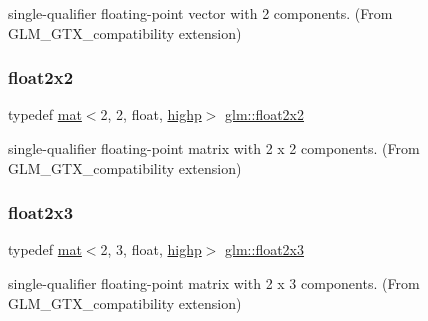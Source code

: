 single-\/qualifier floating-\/point vector with 2 components. (From G\+L\+M\+\_\+\+G\+T\+X\+\_\+compatibility extension) 

\mbox{\label{group__gtx__compatibility_gab3fb1cd56ec3f5407a4d3b9173bd88ae}} 
\subsubsection{\texorpdfstring{float2x2}{float2x2}}
{\footnotesize\ttfamily typedef \hyperlink{structglm_1_1mat}{mat}$<$2, 2, float, \hyperlink{namespaceglm_a36ed105b07c7746804d7fdc7cc90ff25ac6f7eab42eacbb10d59a58e95e362074}{highp}$>$ \hyperlink{group__gtx__compatibility_gab3fb1cd56ec3f5407a4d3b9173bd88ae}{glm\+::float2x2}}



single-\/qualifier floating-\/point matrix with 2 x 2 components. (From G\+L\+M\+\_\+\+G\+T\+X\+\_\+compatibility extension) 

\mbox{\label{group__gtx__compatibility_ga32644dc8b8177c22355e4d03b06061ac}} 
\subsubsection{\texorpdfstring{float2x3}{float2x3}}
{\footnotesize\ttfamily typedef \hyperlink{structglm_1_1mat}{mat}$<$2, 3, float, \hyperlink{namespaceglm_a36ed105b07c7746804d7fdc7cc90ff25ac6f7eab42eacbb10d59a58e95e362074}{highp}$>$ \hyperlink{group__gtx__compatibility_ga32644dc8b8177c22355e4d03b06061ac}{glm\+::float2x3}}



single-\/qualifier floating-\/point matrix with 2 x 3 components. (From G\+L\+M\+\_\+\+G\+T\+X\+\_\+compatibility extension) 

\mbox{\label{group__gtx__compatibility_gadd10766e2393a0e0eaf91ae4d2e85f35}} 
